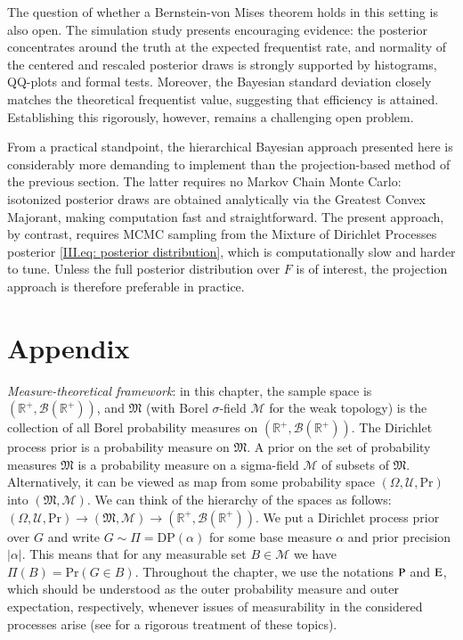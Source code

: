The question of whether a Bernstein-von Mises theorem holds in this setting is also open. The simulation study presents encouraging evidence: the posterior concentrates around the truth at the expected frequentist rate, and normality of the centered and rescaled posterior draws is strongly supported by histograms, QQ-plots and formal tests. Moreover, the Bayesian standard deviation closely matches the theoretical frequentist value, suggesting that efficiency is attained. Establishing this rigorously, however, remains a challenging open problem.

From a practical standpoint, the hierarchical Bayesian approach presented here is considerably more demanding to implement than the projection-based method of the previous section. The latter requires no Markov Chain Monte Carlo: isotonized posterior draws are obtained analytically via the Greatest Convex Majorant, making computation fast and straightforward. The present approach, by contrast, requires MCMC sampling from the Mixture of Dirichlet Processes posterior \eqref{III.eq: posterior distribution}, which is computationally slow and harder to tune. Unless the full posterior distribution over $F$ is of interest, the projection approach is therefore preferable in practice.

\newpage

\section{Appendix}\label{sec: appendix}
\textit{Measure-theoretical framework}: in this chapter, the sample space is $(\mathbb{R}^+, \mathscr{B}(\mathbb{R}^+))$, and $\mathfrak{M}$ (with Borel $\sigma$-field $\mathscr{M}$ for the weak topology) is the collection of all Borel probability measures on $(\mathbb{R}^+, \mathscr{B}(\mathbb{R}^+))$. The Dirichlet process prior is a probability measure on $\mathfrak{M}$. A prior on the set of probability measures $\mathfrak{M}$ is a probability measure on a sigma-field $\mathscr{M}$ of subsets of $\mathfrak{M}$. Alternatively, it can be viewed as map from some probability space $(\Omega, \mathscr{U}, \mathrm{Pr})$ into $(\mathfrak{M}, \mathscr{M})$. We can think of the hierarchy of the spaces as follows: $(\Omega, \mathscr{U}, \mathrm{Pr}) \rightarrow (\mathfrak{M}, \mathscr{M}) \rightarrow (\mathbb{R}^+, \mathscr{B}(\mathbb{R}^+))$. We put a Dirichlet process prior over $G$ and write $G \sim \Pi = \mathrm{DP}( \alpha)$ for some base measure $\alpha$ and prior precision $|\alpha|$. This means that for any measurable set $B \in \mathscr{M}$ we have $\Pi(B) = \mathrm{Pr} ( G \in B)$. Throughout the chapter, we use the notations $\mathrm{P}$ and $\mathrm{E}$, which should be understood as the outer probability measure and outer expectation, respectively, whenever issues of measurability in the considered processes arise (see \cite{5} for a rigorous treatment of these topics). 

